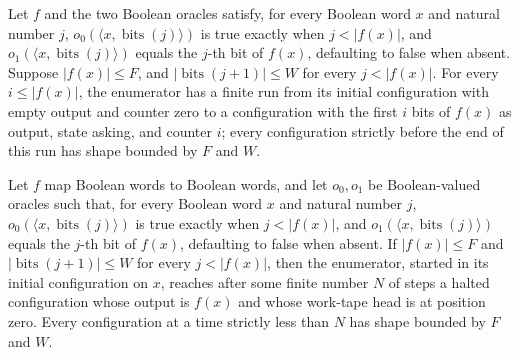 \begin{lemma}
\label{Complexity.ImplicitEnum.rounds}
\leanok
{}
Let $f$ and the two Boolean oracles satisfy, for every Boolean word $x$ and natural
number $j$, $o_0(\langle x,\operatorname{bits}(j)\rangle)$ is true exactly when
$j<|f(x)|$, and $o_1(\langle x,\operatorname{bits}(j)\rangle)$ equals the $j$-th bit of
$f(x)$, defaulting to false when absent. Suppose $|f(x)|\le F$, and
$|\operatorname{bits}(j+1)|\le W$ for every $j<|f(x)|$. For every $i\le |f(x)|$, the
enumerator has a finite run from its initial configuration with empty output and counter
zero to a configuration with the first $i$ bits of $f(x)$ as output, state asking, and
counter $i$; every configuration strictly before the end of this run has shape bounded
by $F$ and $W$.
\end{lemma}

\begin{lemma}
\label{Complexity.ImplicitEnum.run}
\leanok
{}
Let $f$ map Boolean words to Boolean words, and let $o_0,o_1$ be Boolean-valued oracles
such that, for every Boolean word $x$ and natural number $j$, $o_0(\langle
x,\operatorname{bits}(j)\rangle)$ is true exactly when $j<|f(x)|$, and $o_1(\langle
x,\operatorname{bits}(j)\rangle)$ equals the $j$-th bit of $f(x)$, defaulting to false
when absent. If $|f(x)|\le F$ and $|\operatorname{bits}(j+1)|\le W$ for every
$j<|f(x)|$, then the enumerator, started in its initial configuration on $x$, reaches
after some finite number $N$ of steps a halted configuration whose output is $f(x)$ and
whose work-tape head is at position zero. Every configuration at a time strictly less
than $N$ has shape bounded by $F$ and $W$.
\end{lemma}

